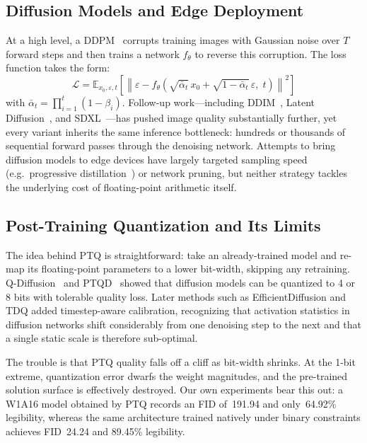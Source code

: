 \documentclass[twocolumn, journal]{IEEEtran}
\begin{document}
\subsection{Diffusion Models and Edge Deployment}

At a high level, a DDPM~\cite{ho2020ddpm} corrupts training images with Gaussian noise
over $T$ forward steps and then trains a network $f_\theta$ to reverse this corruption.
The loss function takes the form:
\begin{equation}
  \mathcal{L} = \mathbb{E}_{x_0,\varepsilon,t}\!\left[
    \left\|\varepsilon - f_\theta\!\left(\sqrt{\bar\alpha_t}\,x_0 +
    \sqrt{1-\bar\alpha_t}\,\varepsilon,\;t\right)\right\|^2\right]
  \label{eq:ddpm}
\end{equation}
with $\bar\alpha_t = \prod_{i=1}^{t}(1-\beta_i)$. Follow-up work---including
DDIM~\cite{song2020ddim}, Latent Diffusion~\cite{rombach2022ldm}, and
SDXL~\cite{podell2023sdxl}---has pushed image quality substantially further, yet every
variant inherits the same inference bottleneck: hundreds or thousands of sequential
forward passes through the denoising network. Attempts to bring diffusion models to edge
devices have largely targeted sampling speed (e.g.\ progressive
distillation~\cite{salimans2022progressive}) or network pruning, but neither strategy
tackles the underlying cost of floating-point arithmetic itself.

\subsection{Post-Training Quantization and Its Limits}

The idea behind PTQ is straightforward: take an already-trained model and re-map its
floating-point parameters to a lower bit-width, skipping any retraining.
Q-Diffusion~\cite{li2023qdiffusion} and PTQD~\cite{he2023ptqd} showed that diffusion
models can be quantized to 4 or 8 bits with tolerable quality loss. Later methods such
as EfficientDiffusion and TDQ added timestep-aware calibration, recognizing that
activation statistics in diffusion networks shift considerably from one denoising step
to the next and that a single static scale is therefore sub-optimal.

The trouble is that PTQ quality falls off a cliff as bit-width shrinks. At the 1-bit
extreme, quantization error dwarfs the weight magnitudes, and the pre-trained solution
surface is effectively destroyed. Our own experiments bear this out: a W1A16 model
obtained by PTQ records an FID of~191.94 and only~64.92\% legibility, whereas the same
architecture trained natively under binary constraints achieves FID~24.24 and 89.45\%
legibility.
\end{document}
